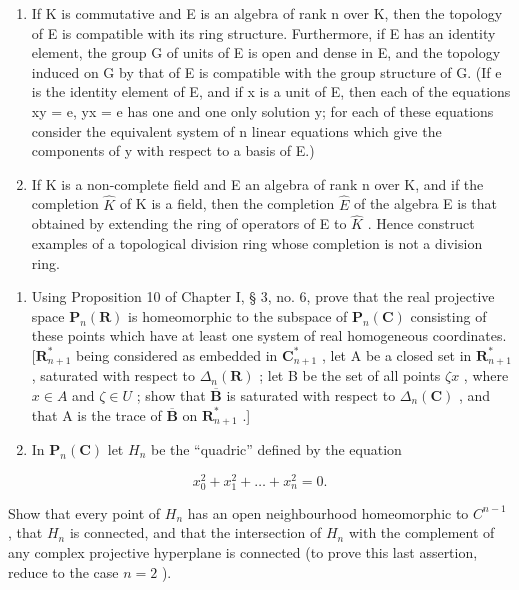 \begin{enumerate}
\def\labelenumi{\alph{enumi})}
\setcounter{enumi}{2}
\item
  If K is commutative and E is an algebra of rank n over K, then the topology of E is compatible with its ring structure. Furthermore, if E has an identity element, the group G of units of E is open and dense in E, and the topology induced on G by that of E is compatible with the group structure of G. (If e is the identity element of E, and if x is a unit of E, then each of the equations xy = e, yx = e has one and one only solution y; for each of these equations consider the equivalent system of n linear equations which give the components of y with respect to a basis of E.)
\item
  If K is a non-complete field and E an algebra of rank n over K, and if the completion \(\hat{K}\) of K is a field, then the completion \(\hat{E}\) of the algebra E is that obtained by extending the ring of operators of E to \(\hat{K}\) . Hence construct examples of a topological division ring whose completion is not a division ring.
\end{enumerate}

\begin{enumerate}
\def\labelenumi{\arabic{enumi})}
\setcounter{enumi}{2}
\item
  Using Proposition 10 of Chapter I, § 3, no. 6, prove that the real projective space \(\mathbf{P}_{n}(\mathbf{R})\) is homeomorphic to the subspace of \(\mathbf{P}_{n}(\mathbf{C})\) consisting of these points which have at least one system of real homogeneous coordinates. \([\mathbf{R}_{n+1}^{*}\) being considered as embedded in \(\mathbf{C}_{n+1}^{*}\) , let A be a closed set in \(\mathbf{R}_{n+1}^{*}\) , saturated with respect to \(\Delta_{n}(\mathbf{R})\) ; let B be the set of all points \(\zeta x\) , where \(x \in A\) and \(\zeta \in U\) ; show that \(\overline{\mathbf{B}}\) is saturated with respect to \(\Delta_{n}(\mathbf{C})\) , and that A is the trace of \(\overline{\mathbf{B}}\) on \(\mathbf{R}_{n+1}^{*}\) .{]}
\item
  In \(\mathbf{P}_{n}(\mathbf{C})\) let \(H_{n}\) be the ``quadric'' defined by the equation
\end{enumerate}

\[
x _ {0} ^ {2} + x _ {1} ^ {2} + \dots + x _ {n} ^ {2} = 0.
\]

Show that every point of \(H_{n}\) has an open neighbourhood homeomorphic to \(C^{n-1}\) , that \(H_{n}\) is connected, and that the intersection of \(H_{n}\) with the complement of any complex projective hyperplane is connected (to prove this last assertion, reduce to the case \(n = 2\) ).

